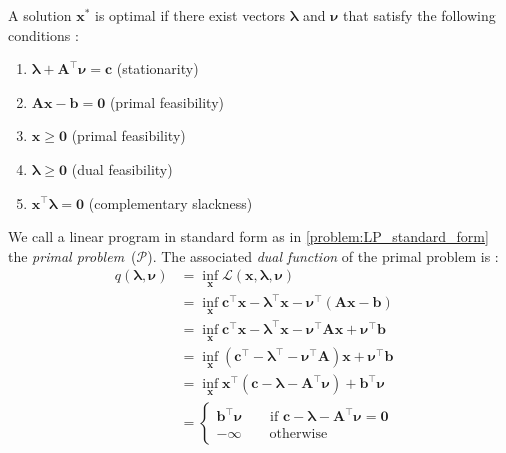 \begin{theorem} \label{theorem:lp_duality}
    A solution $\mathbf x^*$ is optimal if there exist vectors $\boldsymbol \lambda$ and $\boldsymbol \nu$ that satisfy the following conditions \cite{noauthor_numerical_2006}:
    \begin{enumerate}
        \item $\boldsymbol \lambda + \mathbf A^\intercal \boldsymbol \nu = \mathbf c $ \hfill (stationarity)
        \item $ \mathbf A \mathbf x - \mathbf b = \mathbf 0$ \hfill (primal feasibility)
        \item $\mathbf x \geq \mathbf 0$ \hfill (primal feasibility)
        \item $\boldsymbol \lambda \geq \mathbf 0$ \hfill (dual feasibility)
        \item $\mathbf x^\intercal \boldsymbol \lambda = \mathbf 0$ \hfill (complementary slackness)
    \end{enumerate}
\end{theorem} 
We call a linear program in standard form as in \cref{problem:LP_standard_form} the \textit{primal problem}~($\mathcal{P}$).
The associated \textit{dual function} of the primal problem is \cite{aps_mosek_nodate, boyd_stephen_convex_2004}:
\begin{align*}
    q(\boldsymbol \lambda, \boldsymbol \nu)
    & = \inf_{\mathbf x} \mathcal{L} (\mathbf x, \boldsymbol \lambda, \boldsymbol \nu) \\
    & = \inf_{\mathbf x} \mathbf c^\intercal \mathbf x - \boldsymbol \lambda^\intercal \mathbf x - \boldsymbol \nu^\intercal (\mathbf A \mathbf x - \mathbf b) & \\
    & = \inf_{\mathbf x} \mathbf c^\intercal \mathbf x - \boldsymbol \lambda^\intercal \mathbf x - \boldsymbol \nu^\intercal \mathbf A \mathbf x + \boldsymbol \nu^\intercal \mathbf b  &\\
    & = \inf_{\mathbf x} (\mathbf c^\intercal - \boldsymbol \lambda^\intercal - \boldsymbol \nu^\intercal \mathbf A) \mathbf x + \boldsymbol \nu^\intercal \mathbf b  &\\
    & = \inf_{\mathbf x} \mathbf x^\intercal (\mathbf c - \boldsymbol \lambda - \mathbf A^\intercal \boldsymbol \nu) + \mathbf b^\intercal \boldsymbol \nu &\\
    & = \left\{
    \begin{array}{lr}
        \mathbf b^\intercal \boldsymbol \nu \quad \quad \text{if} \, \, \mathbf c - \boldsymbol \lambda - \mathbf A^\intercal \boldsymbol \nu = \mathbf 0\\
        - \infty \quad \quad \text{otherwise}
    \end{array}
    \right.
\end{align*}

